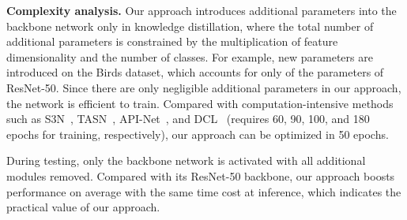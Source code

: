 \documentclass[journal]{IEEEtran}
\begin{document}
\textbf{Complexity analysis.} Our approach introduces additional parameters into the backbone network only in knowledge distillation, where the total number of additional parameters is constrained by the multiplication of feature dimensionality and the number of classes. For example,  new parameters are introduced on the Birds dataset, which accounts for only  of the parameters of ResNet-50. Since there are only negligible additional parameters in our approach, the network is efficient to train. Compared with computation-intensive methods such as S3N~\cite{s3n@19iccv}, TASN~\cite{trilinear_attention@luojiebo}, API-Net~\cite{attentive_pairwise_interaction@20aaai}, and DCL~\cite{dcl@meitao} (requires 60, 90, 100, and 180 epochs for training, respectively), our approach can be optimized in 50 epochs.

During testing, only the backbone network is activated with all additional modules removed. Compared with its ResNet-50 backbone, our approach boosts performance  on average with the same time cost at inference, which indicates the practical value of our approach.
\end{document}
